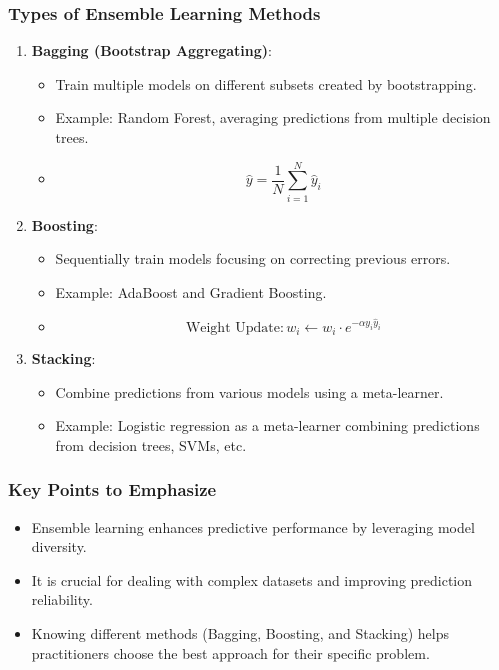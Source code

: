\documentclass[aspectratio=169]{beamer}
\begin{document}
\begin{frame}[fragile]
    \frametitle{Types of Ensemble Learning Methods}
    \begin{enumerate}
        \item \textbf{Bagging (Bootstrap Aggregating)}:
            \begin{itemize}
                \item Train multiple models on different subsets created by bootstrapping.
                \item Example: Random Forest, averaging predictions from multiple decision trees.
                \item \begin{equation}
                \hat{y} = \frac{1}{N} \sum_{i=1}^{N} \hat{y}_i
                \end{equation}
            \end{itemize}
        
        \item \textbf{Boosting}:
            \begin{itemize}
                \item Sequentially train models focusing on correcting previous errors.
                \item Example: AdaBoost and Gradient Boosting.
                \item \begin{equation}
                \text{Weight Update}: w_i \gets w_i \cdot e^{-\alpha y_i \hat{y}_i}
                \end{equation}
            \end{itemize}
        
        \item \textbf{Stacking}:
            \begin{itemize}
                \item Combine predictions from various models using a meta-learner.
                \item Example: Logistic regression as a meta-learner combining predictions from decision trees, SVMs, etc.
            \end{itemize}
    \end{enumerate}
\end{frame}

\begin{frame}[fragile]
    \frametitle{Key Points to Emphasize}
    \begin{itemize}
        \item Ensemble learning enhances predictive performance by leveraging model diversity.
        \item It is crucial for dealing with complex datasets and improving prediction reliability.
        \item Knowing different methods (Bagging, Boosting, and Stacking) helps practitioners choose the best approach for their specific problem.
    \end{itemize}
\end{frame}
\end{document}
